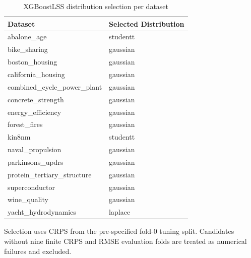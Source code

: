 \begin{table}[htbp]
\centering
\caption{XGBoostLSS distribution selection per dataset}
\label{tab:xgboostlss-selection}
\begin{tabular}{ll}
\toprule
Dataset & Selected Distribution \\
\midrule
abalone\_age & studentt \\
bike\_sharing & gaussian \\
boston\_housing & gaussian \\
california\_housing & gaussian \\
combined\_cycle\_power\_plant & gaussian \\
concrete\_strength & gaussian \\
energy\_efficiency & gaussian \\
forest\_fires & gaussian \\
kin8nm & studentt \\
naval\_propulsion & gaussian \\
parkinsons\_updrs & gaussian \\
protein\_tertiary\_structure & gaussian \\
superconductor & gaussian \\
wine\_quality & gaussian \\
yacht\_hydrodynamics & laplace \\
\bottomrule
\end{tabular}
\par\smallskip\footnotesize{Selection uses CRPS from the pre-specified fold-0 tuning split. Candidates without nine finite CRPS and RMSE evaluation folds are treated as numerical failures and excluded.}
\end{table}
